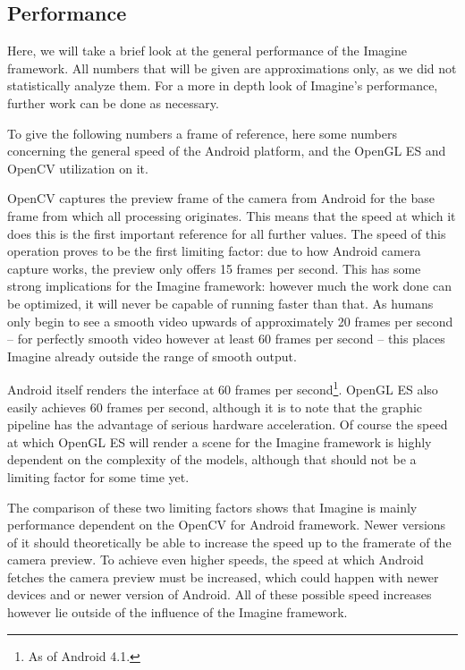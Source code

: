 \subsection{Performance}
\label{performance}

Here, we will take a brief look at the general performance of the Imagine framework.
All numbers that will be given are approximations only, as we did not statistically analyze them.
For a more in depth look of Imagine's performance, further work can be done as necessary.

To give the following numbers a frame of reference, here some numbers concerning the general speed of the Android platform, and the OpenGL ES and OpenCV utilization on it.

OpenCV captures the preview frame of the camera from Android for the base frame from which all processing originates.
This means that the speed at which it does this is the first important reference for all further values.
The speed of this operation proves to be the first limiting factor: due to how Android camera capture works, the preview only offers 15 frames per second.
This has some strong implications for the Imagine framework: however much the work done can be optimized, it will never be capable of running faster than that.
As humans only begin to see a smooth video upwards of approximately 20 frames per second – for perfectly smooth video however at least 60 frames per second – this places Imagine already outside the range of smooth output.

Android itself renders the interface at 60 frames per second\footnote{As of Android 4.1.}.
OpenGL ES also easily achieves 60 frames per second, although it is to note that the graphic pipeline has the advantage of serious hardware acceleration.
Of course the speed at which OpenGL ES will render a scene for the Imagine framework is highly dependent on the complexity of the models, although that should not be a limiting factor for some time yet.

The comparison of these two limiting factors shows that Imagine is mainly performance dependent on the OpenCV for Android framework.
Newer versions of it should theoretically be able to increase the speed up to the framerate of the camera preview.
To achieve even higher speeds, the speed at which Android fetches the camera preview must be increased, which could happen with newer devices and or newer version of Android.
All of these possible speed increases however lie outside of the influence of the Imagine framework.

